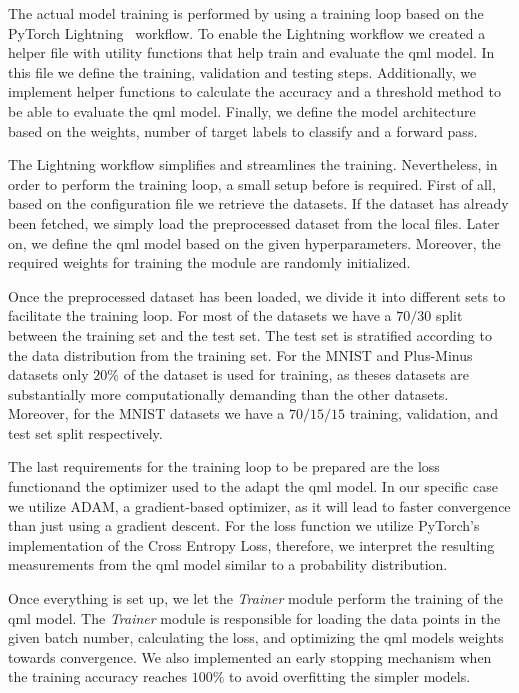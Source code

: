 The actual model training is performed by using a training loop
based on the PyTorch Lightning~\cite{falcon_pytorch_2019} workflow.
To enable the Lightning workflow we created a helper file with
utility functions that help train and evaluate the \ac{qml} model.
In this file we define the training, validation and testing steps.
Additionally, we implement helper functions to calculate the 
accuracy and a threshold method to be able to evaluate the \ac{qml}
model. Finally, we define the model architecture based on the
weights, number of target labels to classify and a forward pass. \

The Lightning workflow simplifies and streamlines the training.
Nevertheless, in order to perform the training loop, a small
setup before is required. First of all, based on the configuration
file we retrieve the datasets. If the dataset has already been
fetched, we simply load the preprocessed dataset from the local files.
Later on, we define the \ac{qml} model based on the given hyperparameters.
Moreover, the required weights for training the module are randomly
initialized. \


Once the preprocessed dataset has been loaded, we divide it into
different sets to facilitate the training loop. For most of
the datasets we have a \(70/30\) split between the training
set and the test set. The test set is stratified according
to the data distribution from the training set. For the
MNIST and Plus-Minus datasets only \(20\%\) of the dataset
is used for training, as theses datasets are substantially
more computationally demanding than the other datasets. Moreover,
for the MNIST datasets we have a \(70/15/15\) training, 
validation, and test set split respectively. \

The last requirements for the training loop to be prepared are the
loss functionand the optimizer used to the adapt the \ac{qml} model. In our
specific case we utilize ADAM, a gradient-based optimizer, as it will
lead to faster convergence than just using a gradient descent. For the
loss function we utilize PyTorch's implementation of the Cross Entropy
Loss, therefore, we interpret the resulting measurements from the
\ac{qml} model similar to a probability distribution.  \

Once everything is set up, we let the \textit{Trainer} module
perform the training of the \ac{qml} model. The \textit{Trainer}
module is responsible for loading the data points in the given
batch number, calculating the loss, and optimizing the \ac{qml}
models weights towards convergence. We also implemented an early
stopping mechanism when the training accuracy reaches \(100\%\)
to avoid overfitting the simpler models. \

